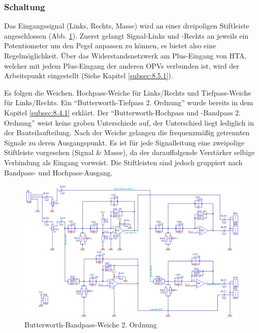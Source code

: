 \subsubsection{Schaltung}\label{subsec:5.4.2}
Das Eingangssignal (Links, Rechts, Masse) wird an einer dreipoligen Stiftleiste angeschlossen (Abb. \ref{fig:5.4.2.1}).
Zuerst gelangt Signal-Links und -Rechts an jeweils ein Potentiometer um den Pegel anpassen zu können, es bietet also eine Regelmöglichkeit.
Über das Widerstandsnetzwerk am Plus-Eingang von HTA, welcher mit jedem Plus-Eingang der anderen OPVs verbunden ist, wird der Arbeitspunkt eingestellt (Siehe Kapitel \ref{subsec:8.5.1}). 

\newpage
Es folgen die Weichen.
Hochpass-Weiche für Links/Rechts und Tiefpass-Weiche für Links/Rechts.
Ein \enquote{Butterworth-Tiefpass 2. Ordnung} wurde bereits in dem Kapitel \ref{subsec:8.4.1} erklärt.
Der \enquote{Butterworth-Hochpass und -Bandpass 2. Ordnung} weist keine groben Unterschiede auf, der Unterschied liegt lediglich in der Bauteilaufteilung.
Nach der Weiche gelangen die frequenzmäßig getrennten Signale zu deren Ausgangspunkt. Es ist für jede Signalleitung eine zweipolige Stiftleiste vorgesehen (Signal \& Masse), da der darauffolgende Verstärker selbige Verbindung als Eingang vorweist.
Die Stiftleisten sind jedoch gruppiert nach Bandpass- und Hochpass-Ausgang.
\begin{figure} [H]
	\centering	
	\includegraphics[width=1\textwidth]{img/Print4/4_TTuHTWeiche-Schematic.PNG}
	\caption{Butterworth-Bandpass-Weiche 2. Ordnung}
	\label {fig:5.4.2.1}
\end{figure}


